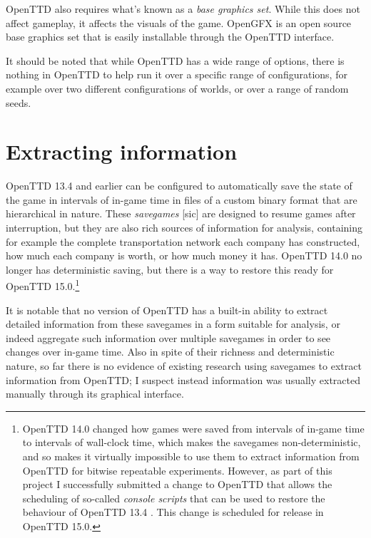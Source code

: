 \documentclass[logo,msc,dsti]{style/infthesis}    %
\begin{document}
{\begin{itemize}
\end{itemize}
%
OpenTTD also requires what's known as a \emph{base graphics set}. While this does not affect gameplay, it affects the visuals of the game. OpenGFX \cite{OpenGFXSource} is an open source base graphics set that is easily installable through the OpenTTD interface.

It should be noted that while OpenTTD has a wide range of options, there is nothing in OpenTTD to help run it over a specific range of configurations, for example over two different configurations of worlds, or over a range of random seeds.

\section{Extracting information}

OpenTTD 13.4 and earlier can be configured to automatically save the state of the game in intervals of in-game time in files of a custom binary format that are hierarchical in nature. These \emph{savegames} [sic] are designed to resume games after interruption, but they are also rich sources of information for analysis, containing for example the complete transportation network each company has constructed, how much each company is worth, or how much money it has. OpenTTD 14.0 no longer has deterministic saving, but there is a way to restore this ready for OpenTTD 15.0.\footnote{OpenTTD 14.0 changed how games were saved from intervals of in-game time to intervals of wall-clock time, which makes the savegames non-deterministic, and so makes it virtually impossible to use them to extract information from OpenTTD for bitwise repeatable experiments. However, as part of this project I successfully submitted a change to OpenTTD that allows the scheduling of so-called \emph{console scripts} that can be used to restore the behaviour of OpenTTD 13.4 \cite{OpenTTDScheduleScript}. This change is scheduled for release in OpenTTD 15.0.}

It is notable that no version of OpenTTD has a built-in ability to extract detailed information from these savegames in a form suitable for analysis, or indeed aggregate such information over multiple savegames in order to see changes over in-game time. Also in spite of their richness and deterministic nature, so far there is no evidence of existing research using savegames to extract information from OpenTTD; I suspect instead information was usually extracted manually through its graphical interface.

}
\end{document}
